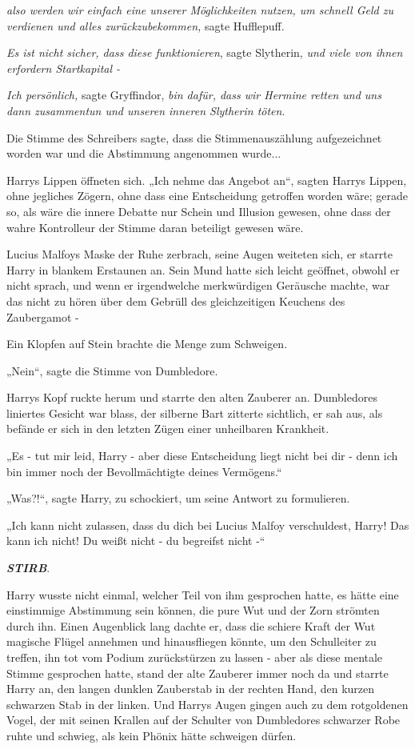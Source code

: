 {\emph{also werden wir einfach eine unserer Möglichkeiten nutzen, um schnell Geld zu verdienen und alles zurückzubekommen,} sagte Hufflepuff.

\emph{Es ist nicht sicher, dass diese funktionieren}, sagte Slytherin, \emph{und viele von ihnen erfordern Startkapital -}

\emph{Ich persönlich,} sagte Gryffindor, \emph{bin dafür, dass wir Hermine retten und uns dann zusammentun und unseren inneren Slytherin töten}.

Die Stimme des Schreibers sagte, dass die Stimmenauszählung aufgezeichnet worden war und die Abstimmung angenommen wurde...

Harrys Lippen öffneten sich. „Ich nehme das Angebot an“, sagten Harrys Lippen, ohne jegliches Zögern, ohne dass eine Entscheidung getroffen worden wäre; gerade so, als wäre die innere Debatte nur Schein und Illusion gewesen, ohne dass der wahre Kontrolleur der Stimme daran beteiligt gewesen wäre.

Lucius Malfoys Maske der Ruhe zerbrach, seine Augen weiteten sich, er starrte Harry in blankem Erstaunen an. Sein Mund hatte sich leicht geöffnet, obwohl er nicht sprach, und wenn er irgendwelche merkwürdigen Geräusche machte, war das nicht zu hören über dem Gebrüll des gleichzeitigen Keuchens des Zaubergamot -

Ein Klopfen auf Stein brachte die Menge zum Schweigen.

„Nein“, sagte die Stimme von Dumbledore.

Harrys Kopf ruckte herum und starrte den alten Zauberer an. Dumbledores liniertes Gesicht war blass, der silberne Bart zitterte sichtlich, er sah aus, als befände er sich in den letzten Zügen einer unheilbaren Krankheit.

„Es - tut mir leid, Harry - aber diese Entscheidung liegt nicht bei dir - denn ich bin immer noch der Bevollmächtigte deines Vermögens.“

„Was?!“, sagte Harry, zu schockiert, um seine Antwort zu formulieren.

„Ich kann nicht zulassen, dass du dich bei Lucius Malfoy verschuldest, Harry! Das kann ich nicht! Du weißt nicht - du begreifst nicht -“

\textbf{\emph{STIRB}}.

Harry wusste nicht einmal, welcher Teil von ihm gesprochen hatte, es hätte eine einstimmige Abstimmung sein können, die pure Wut und der Zorn strömten durch ihn. Einen Augenblick lang dachte er, dass die schiere Kraft der Wut magische Flügel annehmen und hinausfliegen könnte, um den Schulleiter zu treffen, ihn tot vom Podium zurückstürzen zu lassen - aber als diese mentale Stimme gesprochen hatte, stand der alte Zauberer immer noch da und starrte Harry an, den langen dunklen Zauberstab in der rechten Hand, den kurzen schwarzen Stab in der linken. Und Harrys Augen gingen auch zu dem rotgoldenen Vogel, der mit seinen Krallen auf der Schulter von Dumbledores schwarzer Robe ruhte und schwieg, als kein Phönix hätte schweigen dürfen.

}
